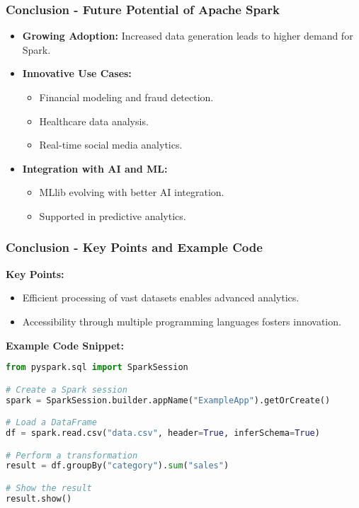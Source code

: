 \documentclass[aspectratio=169]{beamer}
\begin{document}
\begin{frame}[fragile]
    \frametitle{Conclusion - Future Potential of Apache Spark}
    
    \begin{itemize}
        \item \textbf{Growing Adoption:} Increased data generation leads to higher demand for Spark.
        
        \item \textbf{Innovative Use Cases:}
        \begin{itemize}
            \item Financial modeling and fraud detection.
            \item Healthcare data analysis.
            \item Real-time social media analytics.
        \end{itemize}

        \item \textbf{Integration with AI and ML:} 
        \begin{itemize}
            \item MLlib evolving with better AI integration.
            \item Supported in predictive analytics.
        \end{itemize}
    \end{itemize}
\end{frame}

\begin{frame}[fragile]
    \frametitle{Conclusion - Key Points and Example Code}
    
    \textbf{Key Points:}
    \begin{itemize}
        \item Efficient processing of vast datasets enables advanced analytics.
        \item Accessibility through multiple programming languages fosters innovation.
    \end{itemize}

    \textbf{Example Code Snippet:}
    \begin{lstlisting}[language=Python]
from pyspark.sql import SparkSession

# Create a Spark session
spark = SparkSession.builder.appName("ExampleApp").getOrCreate()

# Load a DataFrame
df = spark.read.csv("data.csv", header=True, inferSchema=True)

# Perform a transformation
result = df.groupBy("category").sum("sales")

# Show the result
result.show()
    \end{lstlisting}
\end{frame}
\end{document}
